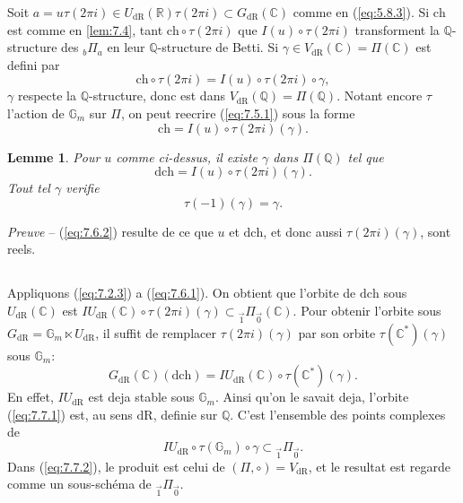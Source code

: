 \documentclass[11pt,a4paper]{article}
\theoremstyle{plain}
\newtheorem{lemma}[theorem]{Lemme}
\theoremstyle{definition}
\newcommand{\Q}{\mathbb{Q}}
\newcommand{\R}{\mathbb{R}}
\newcommand{\C}{\mathbb{C}}
\newcommand{\Gm}{\mathbb{G}_m}
\newcommand{\dR}{\mathrm{dR}}
\begin{document}
Soit $a = u \tau(2\pi i) \in U_{\dR}(\R) \tau(2\pi i) \subset G_{\dR}(\C)$ comme en (\ref{eq:5.8.3}). Si $\mathrm{ch}$ est comme en \ref{lem:7.4}, tant $\mathrm{ch} \circ \tau(2\pi i)$ que $I(u) \circ \tau(2\pi i)$ transforment la $\Q$-structure des ${}_b\Pi_a$ en leur $\Q$-structure de Betti. Si $\gamma \in V_{\dR}(\C) = \Pi(\C)$ est defini par
\begin{equation}\label{eq:7.5.1}
\mathrm{ch} \circ \tau(2\pi i) = I(u) \circ \tau(2\pi i) \circ \gamma,
\end{equation}
$\gamma$ respecte la $\Q$-structure, donc est dans $V_{\dR}(\Q) = \Pi(\Q)$. Notant encore $\tau$ l'action de $\Gm$ sur $\Pi$, on peut reecrire (\ref{eq:7.5.1}) sous la forme
\begin{equation}\label{eq:7.6.1}
\mathrm{ch} = I(u) \circ \tau(2\pi i)(\gamma).
\end{equation}

\begin{lemma}\label{lem:7.6}
Pour $u$ comme ci-dessus, il existe $\gamma$ dans $\Pi(\Q)$ tel que
\begin{equation}
\mathrm{dch} = I(u) \circ \tau(2\pi i)(\gamma).
\end{equation}
Tout tel $\gamma$ verifie
\begin{equation}\label{eq:7.6.2}
\tau(-1)(\gamma) = \gamma.
\end{equation}
\end{lemma}

\noindent \textit{Preuve} -- (\ref{eq:7.6.2}) resulte de ce que $u$ et $\mathrm{dch}$, et donc aussi $\tau(2\pi i)(\gamma)$, sont reels.

\subsection{}\label{ssec:7.7}

Appliquons (\ref{eq:7.2.3}) a (\ref{eq:7.6.1}). On obtient que l'orbite de $\mathrm{dch}$ sous $U_{\dR}(\C)$ est $IU_{\dR}(\C) \circ \tau(2\pi i)(\gamma) \subset {}_{\vec{1}}\Pi_{\vec{0}}(\C)$. Pour obtenir l'orbite sous $G_{\dR} = \Gm \ltimes U_{\dR}$, il suffit de remplacer $\tau(2\pi i)(\gamma)$ par son orbite $\tau(\C^*)(\gamma)$ sous $\Gm$:
\begin{equation}\label{eq:7.7.1}
G_{\dR}(\C)(\mathrm{dch}) = IU_{\dR}(\C) \circ \tau(\C^*)(\gamma).
\end{equation}
En effet, $IU_{\dR}$ est deja stable sous $\Gm$. Ainsi qu'on le savait deja, l'orbite (\ref{eq:7.7.1}) est, au sens $\dR$, definie sur $\Q$. C'est l'ensemble des points complexes de
\begin{equation}\label{eq:7.7.2}
IU_{\dR} \circ \tau(\Gm) \circ \gamma \subset {}_{\vec{1}}\Pi_{\vec{0}}.
\end{equation}
Dans (\ref{eq:7.7.2}), le produit est celui de $(\Pi, \circ) = V_{\dR}$, et le resultat est regarde comme un sous-sch\'ema de ${}_{\vec{1}}\Pi_{\vec{0}}$.
\end{document}
